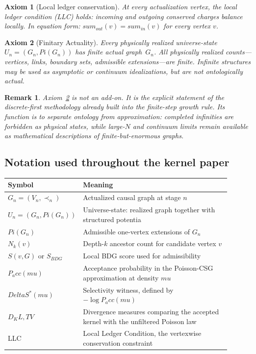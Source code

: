 \documentclass[11pt]{article}
\def\Delta{Delta}%
\def\mu{mu}%
\def\Pi{Pi}%
\def\mathrm#1{#1}%
\def\sum{sum}%
\def\Pacc{P_acc}%
\def\Dkl{D_KL}%
\def\TV{TV}%
\newtheorem{axiom}{Axiom}
\newtheorem{remark}{Remark}
\newcommand{\LLC}{\mathrm{LLC}}
\newcommand{\Pacc}{P_{\mathrm{acc}}}
\newcommand{\Pot}{\Pi}
\newcommand{\Dkl}{D_{\mathrm{KL}}}
\newcommand{\TV}{\mathrm{TV}}
\begin{document}
\begin{axiom}[Local ledger conservation]
\label{ax:llc}
At every actualization vertex, the local ledger condition (LLC) holds: incoming and outgoing conserved charges balance locally. In equation form: $\sum_{\mathrm{out}}(v)=\sum_{\mathrm{in}}(v)$ for every vertex $v$.
\end{axiom}

\begin{axiom}[Finitary Actuality]
\label{ax:finite}
Every physically realized universe-state $U_n=(G_n,\Pot(G_n))$ has finite actual graph~$G_n$. All physically realized counts---vertices, links, boundary sets, admissible extensions---are finite. Infinite structures may be used as asymptotic or continuum idealizations, but are not ontologically actual.
\end{axiom}

\begin{remark}
Axiom~\ref{ax:finite} is not an add-on. It is the explicit statement of the discrete-first methodology already built into the finite-step growth rule. Its function is to separate ontology from approximation: completed infinities are forbidden as physical states, while large-$N$ and continuum limits remain available as mathematical descriptions of finite-but-enormous graphs.
\end{remark}


\subsection*{Notation used throughout the kernel paper}

\begin{center}
\begin{tabular}{>{\raggedright\arraybackslash}p{0.22\linewidth} >{\raggedright\arraybackslash}p{0.68\linewidth}}
\toprule
Symbol & Meaning \\
\midrule
$G_n=(V_n,\prec_n)$ & Actualized causal graph at stage $n$ \\
$U_n=(G_n,\Pot(G_n))$ & Universe-state: realized graph together with structured potentia \\
$\Pot(G_n)$ & Admissible one-vertex extensions of $G_n$ \\
$N_k(v)$ & Depth-$k$ ancestor count for candidate vertex $v$ \\
$S(v,G)$ or $S_{\mathrm{BDG}}$ & Local BDG score used for admissibility \\
$\Pacc(\mu)$ & Acceptance probability in the Poisson-CSG approximation at density $\mu$ \\
$\Delta S^*(\mu)$ & Selectivity witness, defined by $-\log \Pacc(\mu)$ \\
$\Dkl,\TV$ & Divergence measures comparing the accepted kernel with the unfiltered Poisson law \\
\LLC & Local Ledger Condition, the vertexwise conservation constraint \\
\bottomrule
\end{tabular}
\end{center}
\end{document}
